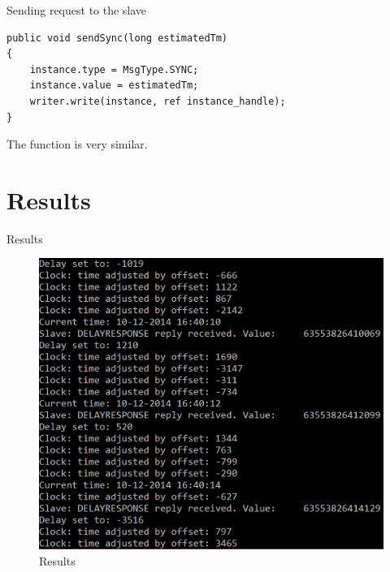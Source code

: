 \documentclass[compressed, presentation, notheorems, 12pt]{beamer}
\begin{document}
 	

	\begin{frame}[containsverbatim]{Sending request to the slave}
	\begin{lstlisting}[style=Code-C++]
public void sendSync(long estimatedTm)
{
	instance.type = MsgType.SYNC;
	instance.value = estimatedTm;
	writer.write(instance, ref instance_handle);
}
	\end{lstlisting}

	The function  is very similar.
	\end{frame}



\section{Results}
\begin{frame}{Results}

\begin{figure}[hbtp]
\centering
\includegraphics[width = 0.82 \textwidth]{SlaveScreen}
\caption{Results}
\end{figure}


\end{frame}
\end{document}
